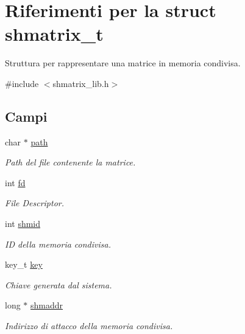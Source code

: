 \hypertarget{structshmatrix__t}{}\section{Riferimenti per la struct shmatrix\+\_\+t}
\label{structshmatrix__t}


Struttura per rappresentare una matrice in memoria condivisa.  




{\ttfamily \#include $<$shmatrix\+\_\+lib.\+h$>$}

\subsection*{Campi}
\begin{DoxyCompactItemize}
\item 
\mbox{\label{structshmatrix__t_a3695e571dac87ca2667854366b54141e}} 
char $\ast$ \hyperlink{structshmatrix__t_a3695e571dac87ca2667854366b54141e}{path}
\begin{DoxyCompactList}\small\item\em Path del file contenente la matrice. \end{DoxyCompactList}\item 
\mbox{\label{structshmatrix__t_aa57d5cb8579cc4eedc468502def8c2e1}} 
int \hyperlink{structshmatrix__t_aa57d5cb8579cc4eedc468502def8c2e1}{fd}
\begin{DoxyCompactList}\small\item\em File Descriptor. \end{DoxyCompactList}\item 
\mbox{\label{structshmatrix__t_a6fafeba2b1aae73a36fda9a012a49044}} 
int \hyperlink{structshmatrix__t_a6fafeba2b1aae73a36fda9a012a49044}{shmid}
\begin{DoxyCompactList}\small\item\em ID della memoria condivisa. \end{DoxyCompactList}\item 
\mbox{\label{structshmatrix__t_a1a81078d2e7a94e8ba6d3a98ac1a4155}} 
key\+\_\+t \hyperlink{structshmatrix__t_a1a81078d2e7a94e8ba6d3a98ac1a4155}{key}
\begin{DoxyCompactList}\small\item\em Chiave generata dal sistema. \end{DoxyCompactList}\item 
\mbox{\label{structshmatrix__t_a2e1a0de8e38807572e9bb1a53f8f598e}} 
long $\ast$ \hyperlink{structshmatrix__t_a2e1a0de8e38807572e9bb1a53f8f598e}{shmaddr}
\begin{DoxyCompactList}\small\item\em Indirizzo di attacco della memoria condivisa. \end{DoxyCompactList}\end{DoxyCompactItemize}


